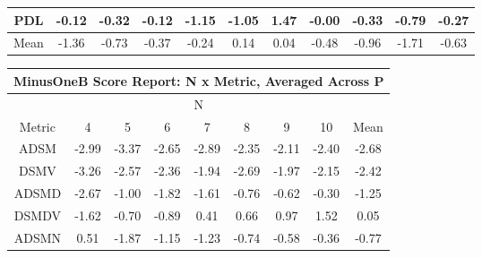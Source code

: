 \documentclass[11pt,a4paper]{report}
\begin{document}
\begin{longtable}{ | c || c | c | c | c | c | c | c | c | c || c |}
PDL &  \cellcolor[HTML]{FFFFFF} -0.12 &  \cellcolor[HTML]{FFF7F7} -0.32 &  \cellcolor[HTML]{FFFFFF} -0.12 &  \cellcolor[HTML]{FFDFDF} -1.15 &  \cellcolor[HTML]{FFE7E7} -1.05 &  \cellcolor[HTML]{D7D7FF} 1.47 &  \cellcolor[HTML]{FFFFFF} -0.00 &  \cellcolor[HTML]{FFF7F7} -0.33 &  \cellcolor[HTML]{FFEFEF} -0.79 &  \cellcolor[HTML]{FFF7F7} -0.27 \\
\hline
\hline
Mean  &  \cellcolor[HTML]{FFDFDF} -1.36 &  \cellcolor[HTML]{FFEFEF} -0.73 &  \cellcolor[HTML]{FFF7F7} -0.37 &  \cellcolor[HTML]{FFF7F7} -0.24 &  \cellcolor[HTML]{FFFFFF} 0.14 &  \cellcolor[HTML]{FFFFFF} 0.04 &  \cellcolor[HTML]{FFEFEF} -0.48 &  \cellcolor[HTML]{FFE7E7} -0.96 &  \cellcolor[HTML]{FFD7D7} -1.71 &  \cellcolor[HTML]{FFEFEF} -0.63 \\
\hline
\end{longtable}
\begin{longtable}{ | c || c | c | c | c | c | c | c || c |}
\hline
\multicolumn{9}{|c|}{ MinusOneB Score Report: N x Metric, Averaged Across P } \\
\hline
\multicolumn{9}{|c|}{ N } \\
\hline
Metric & 4 & 5 & 6 & 7 & 8 & 9 & 10 & Mean\\
\hline
\hline
\endhead
ADSM &  \cellcolor[HTML]{FFB7B7} -2.99 &  \cellcolor[HTML]{FFA7A7} -3.37 &  \cellcolor[HTML]{FFBFBF} -2.65 &  \cellcolor[HTML]{FFB7B7} -2.89 &  \cellcolor[HTML]{FFC7C7} -2.35 &  \cellcolor[HTML]{FFC7C7} -2.11 &  \cellcolor[HTML]{FFBFBF} -2.40 &  \cellcolor[HTML]{FFBFBF} -2.68 \\
DSMV &  \cellcolor[HTML]{FFAFAF} -3.26 &  \cellcolor[HTML]{FFBFBF} -2.57 &  \cellcolor[HTML]{FFC7C7} -2.36 &  \cellcolor[HTML]{FFCFCF} -1.94 &  \cellcolor[HTML]{FFBFBF} -2.69 &  \cellcolor[HTML]{FFCFCF} -1.97 &  \cellcolor[HTML]{FFC7C7} -2.15 &  \cellcolor[HTML]{FFBFBF} -2.42 \\
ADSMD &  \cellcolor[HTML]{FFBFBF} -2.67 &  \cellcolor[HTML]{FFE7E7} -1.00 &  \cellcolor[HTML]{FFCFCF} -1.82 &  \cellcolor[HTML]{FFD7D7} -1.61 &  \cellcolor[HTML]{FFEFEF} -0.76 &  \cellcolor[HTML]{FFEFEF} -0.62 &  \cellcolor[HTML]{FFF7F7} -0.30 &  \cellcolor[HTML]{FFDFDF} -1.25 \\
DSMDV &  \cellcolor[HTML]{FFD7D7} -1.62 &  \cellcolor[HTML]{FFEFEF} -0.70 &  \cellcolor[HTML]{FFE7E7} -0.89 &  \cellcolor[HTML]{F7F7FF} 0.41 &  \cellcolor[HTML]{EFEFFF} 0.66 &  \cellcolor[HTML]{E7E7FF} 0.97 &  \cellcolor[HTML]{D7D7FF} 1.52 &  \cellcolor[HTML]{FFFFFF} 0.05 \\
ADSMN &  \cellcolor[HTML]{EFEFFF} 0.51 &  \cellcolor[HTML]{FFCFCF} -1.87 &  \cellcolor[HTML]{FFDFDF} -1.15 &  \cellcolor[HTML]{FFDFDF} -1.23 &  \cellcolor[HTML]{FFEFEF} -0.74 &  \cellcolor[HTML]{FFEFEF} -0.58 &  \cellcolor[HTML]{FFF7F7} -0.36 &  \cellcolor[HTML]{FFEFEF} -0.77 \\

\end{longtable}
\end{document}

